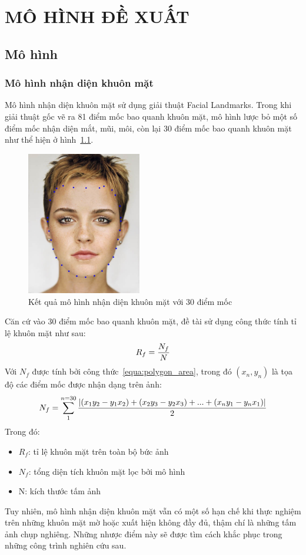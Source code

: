 \chapter{MÔ HÌNH ĐỀ XUẤT}
\section{Mô hình}
\subsection{Mô hình nhận diện khuôn mặt}
Mô hình nhận diện khuôn mặt sử dụng giải thuật Facial Landmarks. Trong khi giải thuật gốc vẽ ra 81 điểm mốc bao quanh khuôn mặt, mô hình lược bỏ một số điểm mốc nhận diện mắt, mũi, môi, còn lại 30 điểm mốc bao quanh khuôn mặt như thể hiện ở hình~\ref{fig:Facial_Landmarks}.

\begin{figure}[ht]
    \centering
    \includegraphics[width=5cm]{Images/Facial_Landmarks.jpg}
    \caption[Kết quả mô hình nhận diện khuôn mặt]
    {Kết quả mô hình nhận diện khuôn mặt với 30 điểm mốc}
    \label{fig:Facial_Landmarks}
\end{figure}
Căn cứ vào 30 điểm mốc bao quanh khuôn mặt, đề tài sử dụng công thức tính tỉ lệ khuôn mặt như sau:
\begin{equation}
R_{f} = \frac{N_{f}}{N}\\
\end{equation}
Với $N_{f}$ được tính bởi công thức~\ref{equa:polygon_area}, trong đó $(x_{n},y_{n})$ là tọa độ các điểm mốc được nhận dạng trên ảnh:
\begin{equation}
N_{f} = \sum_{1}^{n=30} \frac{\lvert(x_{1}y_{2} - y_{1}x_{2}) + (x_{2}y_{3} - y_{2}x_{3}) + ... + (x_{n}y_{1} - y_{n}x_{1})\rvert}{2}\\
\label{equa:polygon_area}
\end{equation}
Trong đó:
\begin{itemize}[noitemsep]
\addtolength{\itemindent}{1.5cm}
    \item $R_{f}$: tỉ lệ khuôn mặt trên toàn bộ bức ảnh\\
    \item $N_{f}$: tổng diện tích khuôn mặt lọc bởi mô hình\\
    \item N: kích thước tấm ảnh
\end{itemize}
Tuy nhiên, mô hình nhận diện khuôn mặt vẫn có một số hạn chế khi thực nghiệm trên những khuôn mặt mờ hoặc xuất hiện không đầy đủ, thậm chí là những tấm ảnh chụp nghiêng. Những nhược điểm này sẽ được tìm cách khắc phục trong những công trình nghiên cứu sau.